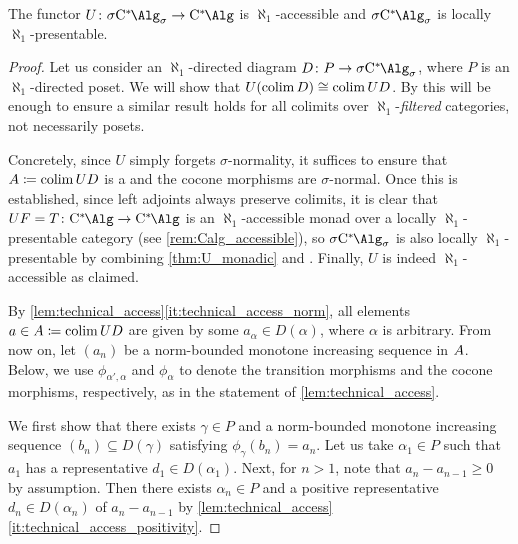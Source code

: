 \begin{theorem}\label{thm:U_accessible}
	The functor $U\colon \SigmaC \to \Calg$ is $\aleph_1$-accessible and $\SigmaC$ is locally $\aleph_1$-presentable.
\end{theorem}
\begin{proof}
	Let us consider an $\aleph_1$-directed diagram $D\colon P \to \SigmaC$, where $P$ is an $\aleph_1$-directed poset.
	We will show that $U(\operatorname{colim} D)\cong \operatorname{colim} UD$. 
	By \cite[Theorem 1.5 and Remark 1.21]{adamek1994locallypresentable} this will be enough to ensure a similar result holds for all colimits over $\aleph_1$-\emph{filtered} categories, not necessarily posets. 

	Concretely, since $U$ simply forgets $\sigma$-normality, it suffices to ensure that ${A} \coloneqq \operatorname{colim} UD$ is a \cstars{} and the cocone morphisms are $\sigma$-normal.
	Once this is established, since left adjoints always preserve colimits, it is clear that $UF=T\colon \Calg \to \Calg$ is an $\aleph_1$-accessible monad over a locally $\aleph_1$-presentable category (see \cref{rem:Calg_accessible}), so $\SigmaC$ is also locally $\aleph_1$-presentable by combining \cref{thm:U_monadic} and \cite[Theorem and Remark 2.78]{adamek1994locallypresentable}.
	Finally, $U$ is indeed $\aleph_1$-accessible as claimed.

	By \cref{lem:technical_access}\ref{it:technical_access_norm}, all elements $a\in {A}\coloneqq\operatorname{colim} UD$ are given by some $a_{\alpha}\in D(\alpha)$, where $\alpha$ is arbitrary.
	From now on, let $(a_n)$ be a norm-bounded monotone increasing sequence in ${A}$. %
	Below, we use $\phi_{\alpha',\alpha}$ and $\phi_{\alpha}$ to denote the transition morphisms and the cocone morphisms, respectively, as in the statement of \cref{lem:technical_access}.

	We first show that there exists $\gamma \in P$ and a norm-bounded monotone increasing sequence $(b_n)\subseteq D(\gamma)$ satisfying $\phi_{\gamma}(b_n)=a_n$.
	Let us take $\alpha_1\in P$ such that $a_1$ has a representative $d_1\in D(\alpha_1)$.
	Next, for $n>1$, note that $a_n-a_{n-1}\ge 0$ by assumption.
	Then there exists $\alpha_n\in P$ and a positive representative $d_n \in D(\alpha_n)$ of ${a_n - a_{n-1}}$ by \cref{lem:technical_access}\ref{it:technical_access_positivity}.


\end{proof}
